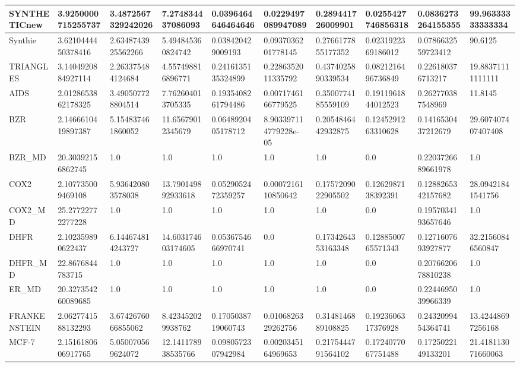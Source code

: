 \documentclass{article}
\begin{document}
\begin{table}[!ht]
\begin{tabular}{|l|l|l|l|l|l|l|l|l|l|}
        SYNTHETICnew & 3.9250000715255737 & 3.4872567329242026 & 7.274834437086093 & 0.0396464646464646 & 0.0229497089947089 & 0.289441726009901 & 0.0255427746856318 & 0.0836273264155355 & 99.96333333333334 \\ \hline
        Synthie & 3.6210444450378416 & 2.6348743925562266 & 5.494845360824742 & 0.038420429009193 & 0.0937036201778145 & 0.2766177855177352 & 0.0231922369186012 & 0.0786632559723412 & 90.6125 \\ \hline
        TRIANGLES & 3.1404920884927114 & 2.263375484124684 & 4.557498816896771 & 0.2416135135324899 & 0.2286352011335792 & 0.4374025890339534 & 0.0821216496736849 & 0.226180376713217 & 19.88371111111111 \\ \hline
        AIDS & 2.0128653862178325 & 3.490507728804514 & 7.762604013705335 & 0.1935408261794486 & 0.0071746166779525 & 0.3500774185559109 & 0.1911961844012523 & 0.262770387548969 & 11.8145 \\ \hline
        BZR & 2.1466610419897387 & 5.154837461860052 & 11.65679012345679 & 0.0648920405178712 & 8.903397114779228e-05 & 0.2054846442932875 & 0.1245291263310628 & 0.1416530437212679 & 29.607407407407408 \\ \hline
        BZR\_MD & 20.30392156862745 & 1.0 & 1.0 & 1.0 & 1.0 & 1.0 & 0.0 & 0.2203726689661978 & 1.0 \\ \hline
        COX2 & 2.107735009469108 & 5.936420803578038 & 13.790149892933618 & 0.0529052472359257 & 0.0007216110850642 & 0.1757209022905502 & 0.1262987138392391 & 0.1288265342157682 & 28.09421841541756 \\ \hline
        COX2\_MD & 25.27722772277228 & 1.0 & 1.0 & 1.0 & 1.0 & 1.0 & 0.0 & 0.1957034193657646 & 1.0 \\ \hline
        DHFR & 2.102359890622437 & 6.144674814243727 & 14.603174603174605 & 0.0536754666970741 & 0.0 & 0.1734264353163348 & 0.1288500765571343 & 0.1271607693927877 & 32.21560846560847 \\ \hline
        DHFR\_MD & 22.8676844783715 & 1.0 & 1.0 & 1.0 & 1.0 & 1.0 & 0.0 & 0.2076620678810238 & 1.0 \\ \hline
        ER\_MD & 20.327354260089685 & 1.0 & 1.0 & 1.0 & 1.0 & 1.0 & 0.0 & 0.2244695039966339 & 1.0 \\ \hline
        FRANKENSTEIN & 2.0627741588132293 & 3.6742676066855062 & 8.423452029938762 & 0.1705038719060743 & 0.0106826329262756 & 0.3148146889108825 & 0.1923606317376928 & 0.2432099454364741 & 13.42448697256168 \\ \hline
        MCF-7 & 2.1516180606917765 & 5.050070569624072 & 12.141178938535766 & 0.0980572307942984 & 0.0020345164969653 & 0.2175444791564102 & 0.1724077067751488 & 0.1725022149133201 & 21.418113071660063 \\ \hline

\end{tabular}
\end{table}
\end{document}
